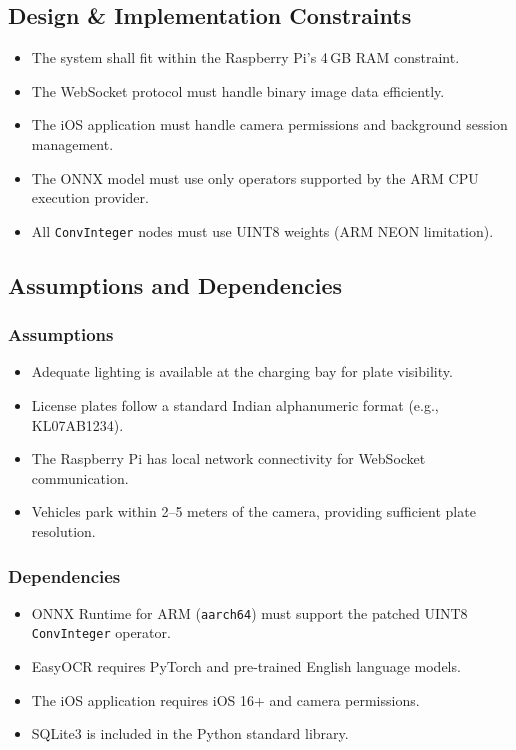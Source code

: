 \subsection{Design \& Implementation Constraints}
\begin{itemize}
    \item The system shall fit within the Raspberry Pi's 4\,GB RAM constraint.
    \item The WebSocket protocol must handle binary image data efficiently.
    \item The iOS application must handle camera permissions and background session management.
    \item The ONNX model must use only operators supported by the ARM CPU execution provider.
    \item All \texttt{ConvInteger} nodes must use UINT8 weights (ARM NEON limitation).
\end{itemize}

\subsection{Assumptions and Dependencies}
\subsubsection{Assumptions}
\begin{itemize}
    \item Adequate lighting is available at the charging bay for plate visibility.
    \item License plates follow a standard Indian alphanumeric format (e.g., KL07AB1234).
    \item The Raspberry Pi has local network connectivity for WebSocket communication.
    \item Vehicles park within 2--5 meters of the camera, providing sufficient plate resolution.
\end{itemize}

\subsubsection{Dependencies}
\begin{itemize}
    \item ONNX Runtime for ARM (\texttt{aarch64}) must support the patched UINT8 \texttt{ConvInteger} operator.
    \item EasyOCR requires PyTorch and pre-trained English language models.
    \item The iOS application requires iOS 16+ and camera permissions.
    \item SQLite3 is included in the Python standard library.
\end{itemize}

